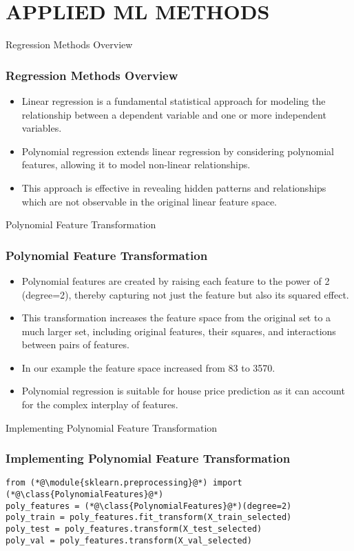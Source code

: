 \section{APPLIED ML METHODS}
\label{applied_ml_methods}


\begin{frame}{Regression Methods Overview}
    \frametitle{Regression Methods Overview}
    \begin{itemize}
        \item Linear regression is a fundamental statistical approach for modeling the relationship between a dependent variable and one or more independent variables.
        \item Polynomial regression extends linear regression by considering polynomial features, allowing it to model non-linear relationships.
        \item This approach is effective in revealing hidden patterns and relationships which are not observable in the original linear feature space.
    \end{itemize}
\end{frame}

\begin{frame}{Polynomial Feature Transformation}
    \frametitle{Polynomial Feature Transformation}
    \begin{itemize}
        \item Polynomial features are created by raising each feature to the power of 2 (degree=2), thereby capturing not just the feature but also its squared effect.
        \item This transformation increases the feature space from the original set to a much larger set, including original features, their squares, and interactions between pairs of features.
        \item In our example the feature space increased from 83 to 3570.
        \item Polynomial regression is suitable for house price prediction as it can account for the complex interplay of features.
    \end{itemize}
\end{frame}

\begin{frame}[fragile]{Implementing Polynomial Feature Transformation}
    \frametitle{Implementing Polynomial Feature Transformation}
    \begin{lstlisting}[caption={Polynomial feature transformation using \texttt{sklearn.preprocessing}.}, label=lst:polynomial_feature_transformation]
from (*@\module{sklearn.preprocessing}@*) import (*@\class{PolynomialFeatures}@*)
poly_features = (*@\class{PolynomialFeatures}@*)(degree=2)
poly_train = poly_features.fit_transform(X_train_selected)
poly_test = poly_features.transform(X_test_selected)
poly_val = poly_features.transform(X_val_selected)
    \end{lstlisting}
\end{frame}

